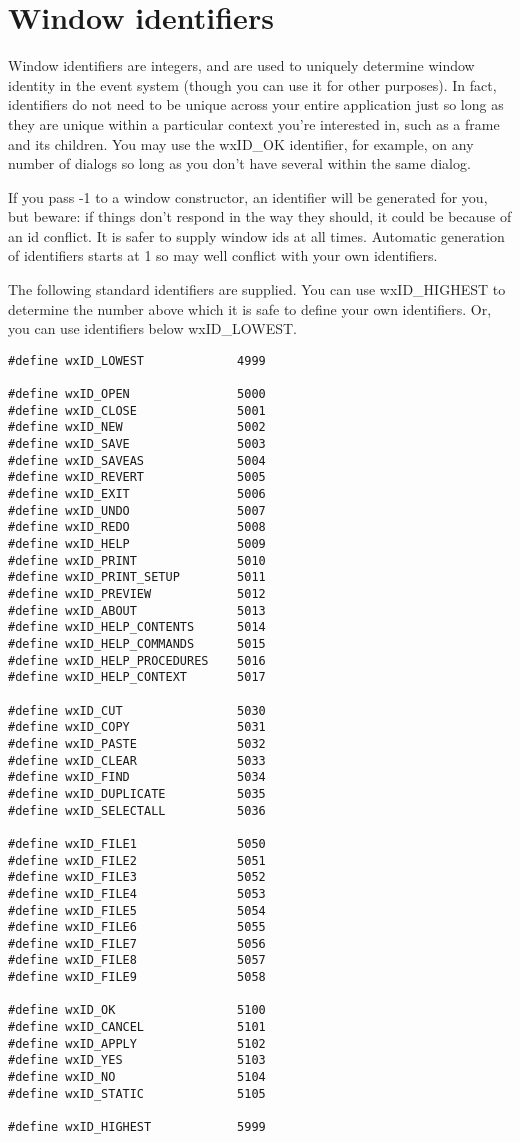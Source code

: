 \section{Window identifiers}\label{windowids}

Window identifiers are integers, and are used to uniquely determine window identity in the
event system (though you can use it for other purposes). In fact, identifiers do not need
to be unique across your entire application just so long as they are unique within a particular context you're interested
in, such as a frame and its children. You may use the wxID\_OK identifier, for example, on
any number of dialogs so long as you don't have several within the same dialog.

If you pass -1 to a window constructor, an identifier will be generated for you, but beware:
if things don't respond in the way they should, it could be because of an id conflict. It is safer
to supply window ids at all times. Automatic generation of identifiers starts at 1 so may well conflict
with your own identifiers.

The following standard identifiers are supplied. You can use wxID\_HIGHEST to determine the
number above which it is safe to define your own identifiers. Or, you can use identifiers below
wxID\_LOWEST.

\begin{verbatim}
#define wxID_LOWEST             4999

#define wxID_OPEN               5000
#define wxID_CLOSE              5001
#define wxID_NEW                5002
#define wxID_SAVE               5003
#define wxID_SAVEAS             5004
#define wxID_REVERT             5005
#define wxID_EXIT               5006
#define wxID_UNDO               5007
#define wxID_REDO               5008
#define wxID_HELP               5009
#define wxID_PRINT              5010
#define wxID_PRINT_SETUP        5011
#define wxID_PREVIEW            5012
#define wxID_ABOUT              5013
#define wxID_HELP_CONTENTS      5014
#define wxID_HELP_COMMANDS      5015
#define wxID_HELP_PROCEDURES    5016
#define wxID_HELP_CONTEXT       5017

#define wxID_CUT                5030
#define wxID_COPY               5031
#define wxID_PASTE              5032
#define wxID_CLEAR              5033
#define wxID_FIND               5034
#define wxID_DUPLICATE          5035
#define wxID_SELECTALL          5036

#define wxID_FILE1              5050
#define wxID_FILE2              5051
#define wxID_FILE3              5052
#define wxID_FILE4              5053
#define wxID_FILE5              5054
#define wxID_FILE6              5055
#define wxID_FILE7              5056
#define wxID_FILE8              5057
#define wxID_FILE9              5058

#define wxID_OK                 5100
#define wxID_CANCEL             5101
#define wxID_APPLY              5102
#define wxID_YES                5103
#define wxID_NO                 5104
#define wxID_STATIC             5105

#define wxID_HIGHEST            5999
\end{verbatim}

